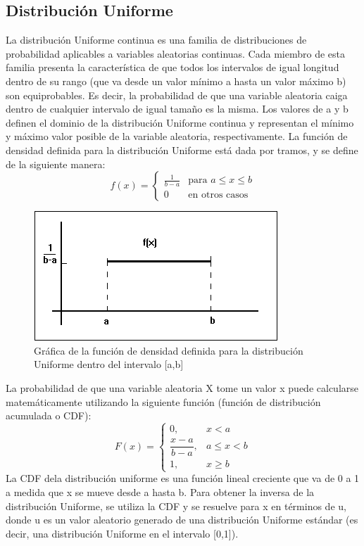 \documentclass{article}
\begin{document}
\subsection{Distribución Uniforme}
 La distribución Uniforme continua es una familia de distribuciones de probabilidad aplicables a variables aleatorias continuas. Cada miembro de esta familia presenta la característica de que todos los intervalos de igual longitud dentro de su rango (que va desde un valor mínimo a hasta un valor máximo b) son equiprobables. Es decir, la probabilidad de que una variable aleatoria caiga dentro de cualquier intervalo de igual tamaño es la misma. Los valores de a y b definen el dominio de la distribución Uniforme continua y representan el mínimo y máximo valor posible de la variable
 aleatoria, respectivamente.
 La función de densidad definida para la distribución Uniforme está dada por tramos, y se define de la siguiente manera:
    \begin{equation}
        f(x) = \begin{cases}
        \frac{1}{b-a} & \text{para } a \leq x \leq b \\
        0 & \text{en otros casos}
    \end{cases}
    \end{equation}
\begin{figure}[H]
    \centering
    \includegraphics[width=0.5\linewidth]{Imagenes/Distr.Uniforme.png}
    \caption{ Gráfica de la función de densidad definida para la distribución Uniforme dentro del intervalo [a,b]}
    \label{fig:Distr.Uniforme}
\end{figure}
La probabilidad de que una variable aleatoria X tome un valor x puede calcularse matemáticamente utilizando la siguiente función (función de distribución acumulada o CDF):
\begin{equation}
    F(x) = 
    \begin{cases}
    0, & x < a \\
    \dfrac{x - a}{b - a}, & a \leq x < b \\
    1, & x \geq b
    \end{cases}
\end{equation}
La CDF dela distribución uniforme es una función lineal creciente que va de 0 a 1 a medida que x se mueve desde a hasta b. Para obtener la inversa de la distribución Uniforme, se utiliza la CDF y se resuelve para x en términos de u, donde u es un valor aleatorio generado de una distribución Uniforme estándar (es decir, una distribución Uniforme en el intervalo [0,1]).
\end{document}
